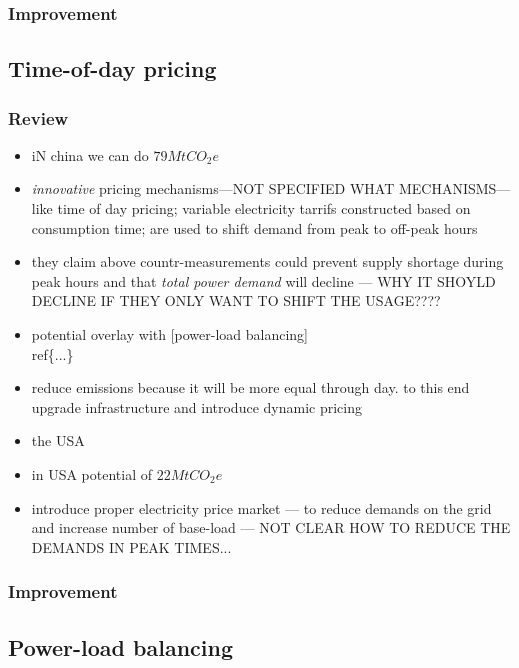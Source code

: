 \documentclass[11pt, twocolumn]{article}
\begin{document}
\subsubsection{Improvement}

\subsection{Time-of-day pricing}
\subsubsection{Review}
\begin{itemize}
\item iN china we can do $79 Mt CO_2e$
\item \emph{innovative} pricing mechanisms---NOT SPECIFIED WHAT MECHANISMS--- like time of day pricing; variable electricity tarrifs constructed based on consumption time; are used to shift demand from peak to off-peak hours
\item they claim above countr-measurements could prevent supply shortage during peak hours and that \emph{total power demand} will decline --- WHY IT SHOYLD DECLINE IF THEY ONLY WANT TO SHIFT THE USAGE????
\item potential overlay with  [power-load balancing]\\ref\{...\}
\item reduce emissions because it will be more equal through day. to this end upgrade infrastructure and introduce dynamic pricing


\item the USA
\item in USA potential of $22 MtCO_2e$
\item introduce proper electricity price market --- to reduce demands on the grid and increase number of base-load --- NOT CLEAR HOW TO REDUCE THE DEMANDS IN PEAK TIMES...

\end{itemize}
\subsubsection{Improvement}

\subsection{Power-load balancing}
\end{document}
